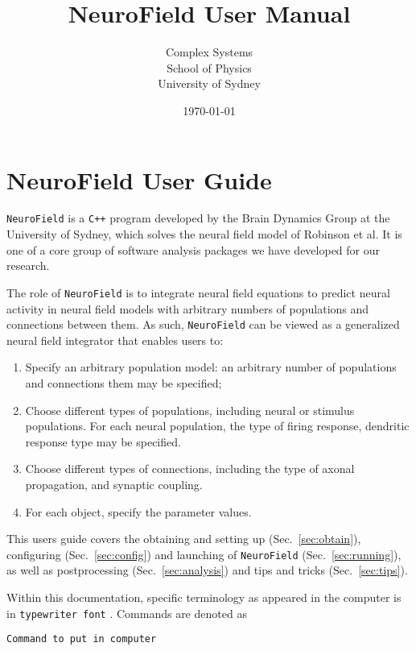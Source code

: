 \documentclass[12pt,a4paper]{article}
\title{NeuroField User Manual}
\author{Complex Systems\\School of Physics\\University of Sydney}
\date{\today}
\newcommand{\type}[1]{{\small\small\tt #1} }
\newcommand{\NF}[0]{\type{NeuroField}}
\newenvironment{worked_example}
{\begin{lrbox}{\mybox}\begin{minipage}{\textwidth}}
{\end{minipage}\end{lrbox}\fcolorbox{black}{skyblue}{\parbox{\textwidth}{{\bf Worked example}\\\\\usebox{\mybox}}}}
\begin{document}
\section*{NeuroField User Guide}

\NF is a \type{C++} program developed by the Brain Dynamics Group at the University of Sydney, which solves the neural field model of Robinson et al. It is one of a core group of software analysis packages we have developed for our research.

The role of \NF is to integrate neural field equations to predict neural activity in neural field models with arbitrary numbers of populations and connections between them. As such, \NF can be viewed as a generalized neural field integrator that enables users to:

\begin{enumerate}
	\item Specify an arbitrary population model: an arbitrary number of populations and connections them may be specified;
	\item Choose different types of populations, including neural or stimulus populations. For each neural population, the type of firing response, dendritic response type may be specified.
	\item Choose different types of connections, including the type of axonal propagation, and synaptic coupling.
	\item For each object, specify the parameter values.
\end{enumerate}

This users guide covers the obtaining and setting up (Sec.~\ref{sec:obtain}), configuring (Sec.~\ref{sec:config}) and launching of \NF (Sec.~\ref{sec:running}), as well as postprocessing (Sec.~\ref{sec:analysis}) and tips and tricks (Sec.~\ref{sec:tips}).

Within this documentation, specific terminology as appeared in the computer is in \type{typewriter font}. Commands are denoted as
\begin{lstlisting}
Command to put in computer
\end{lstlisting}

\end{document}
